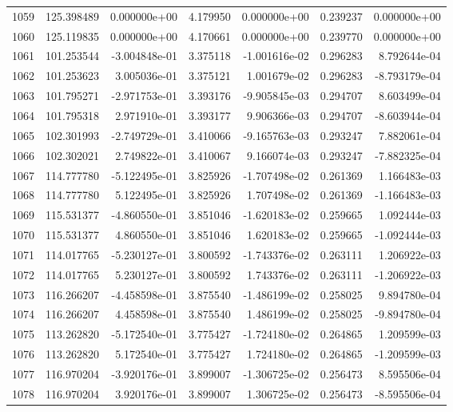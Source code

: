 \begin{tabular}{rrrrrrr}
1059 & 125.398489 &  0.000000e+00 &  4.179950 &  0.000000e+00 &    0.239237 &  0.000000e+00 \\
1060 & 125.119835 &  0.000000e+00 &  4.170661 &  0.000000e+00 &    0.239770 &  0.000000e+00 \\
1061 & 101.253544 & -3.004848e-01 &  3.375118 & -1.001616e-02 &    0.296283 &  8.792644e-04 \\
1062 & 101.253623 &  3.005036e-01 &  3.375121 &  1.001679e-02 &    0.296283 & -8.793179e-04 \\
1063 & 101.795271 & -2.971753e-01 &  3.393176 & -9.905845e-03 &    0.294707 &  8.603499e-04 \\
1064 & 101.795318 &  2.971910e-01 &  3.393177 &  9.906366e-03 &    0.294707 & -8.603944e-04 \\
1065 & 102.301993 & -2.749729e-01 &  3.410066 & -9.165763e-03 &    0.293247 &  7.882061e-04 \\
1066 & 102.302021 &  2.749822e-01 &  3.410067 &  9.166074e-03 &    0.293247 & -7.882325e-04 \\
1067 & 114.777780 & -5.122495e-01 &  3.825926 & -1.707498e-02 &    0.261369 &  1.166483e-03 \\
1068 & 114.777780 &  5.122495e-01 &  3.825926 &  1.707498e-02 &    0.261369 & -1.166483e-03 \\
1069 & 115.531377 & -4.860550e-01 &  3.851046 & -1.620183e-02 &    0.259665 &  1.092444e-03 \\
1070 & 115.531377 &  4.860550e-01 &  3.851046 &  1.620183e-02 &    0.259665 & -1.092444e-03 \\
1071 & 114.017765 & -5.230127e-01 &  3.800592 & -1.743376e-02 &    0.263111 &  1.206922e-03 \\
1072 & 114.017765 &  5.230127e-01 &  3.800592 &  1.743376e-02 &    0.263111 & -1.206922e-03 \\
1073 & 116.266207 & -4.458598e-01 &  3.875540 & -1.486199e-02 &    0.258025 &  9.894780e-04 \\
1074 & 116.266207 &  4.458598e-01 &  3.875540 &  1.486199e-02 &    0.258025 & -9.894780e-04 \\
1075 & 113.262820 & -5.172540e-01 &  3.775427 & -1.724180e-02 &    0.264865 &  1.209599e-03 \\
1076 & 113.262820 &  5.172540e-01 &  3.775427 &  1.724180e-02 &    0.264865 & -1.209599e-03 \\
1077 & 116.970204 & -3.920176e-01 &  3.899007 & -1.306725e-02 &    0.256473 &  8.595506e-04 \\
1078 & 116.970204 &  3.920176e-01 &  3.899007 &  1.306725e-02 &    0.256473 & -8.595506e-04 \\

\end{tabular}
